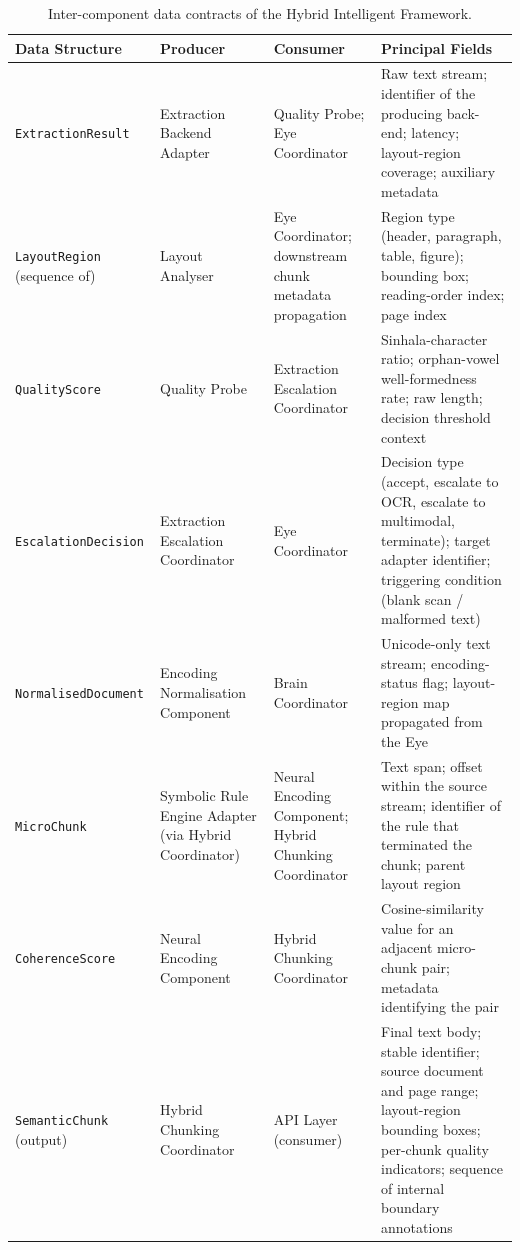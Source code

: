 \documentclass[12pt,a4paper,oneside]{report}
\begin{document}
\begin{table}[h]
\centering
\caption{Inter-component data contracts of the Hybrid Intelligent Framework.}
\label{tab:design-contracts}
\renewcommand{\arraystretch}{1.25}
\footnotesize
\begin{tabularx}{\textwidth}{p{3.0cm} p{3.4cm} p{3.0cm} X}
\hline
\textbf{Data Structure} & \textbf{Producer} & \textbf{Consumer} & \textbf{Principal Fields} \\
\hline
\texttt{ExtractionResult} & Extraction Backend Adapter & Quality Probe; Eye Coordinator & Raw text stream; identifier of the producing back-end; latency; layout-region coverage; auxiliary metadata \\
\hline
\texttt{LayoutRegion} (sequence of) & Layout Analyser & Eye Coordinator; downstream chunk metadata propagation & Region type (header, paragraph, table, figure); bounding box; reading-order index; page index \\
\hline
\texttt{QualityScore} & Quality Probe & Extraction Escalation Coordinator & Sinhala-character ratio; orphan-vowel well-formedness rate; raw length; decision threshold context \\
\hline
\texttt{EscalationDecision} & Extraction Escalation Coordinator & Eye Coordinator & Decision type (accept, escalate to OCR, escalate to multimodal, terminate); target adapter identifier; triggering condition (blank scan / malformed text) \\
\hline
\texttt{NormalisedDocument} & Encoding Normalisation Component & Brain Coordinator & Unicode-only text stream; encoding-status flag; layout-region map propagated from the Eye \\
\hline
\texttt{MicroChunk} & Symbolic Rule Engine Adapter (via Hybrid Coordinator) & Neural Encoding Component; Hybrid Chunking Coordinator & Text span; offset within the source stream; identifier of the rule that terminated the chunk; parent layout region \\
\hline
\texttt{CoherenceScore} & Neural Encoding Component & Hybrid Chunking Coordinator & Cosine-similarity value for an adjacent micro-chunk pair; metadata identifying the pair \\
\hline
\texttt{SemanticChunk} (output) & Hybrid Chunking Coordinator & API Layer (consumer) & Final text body; stable identifier; source document and page range; layout-region bounding boxes; per-chunk quality indicators; sequence of internal boundary annotations \\
\hline
\end{tabularx}
\end{table}
\end{document}

